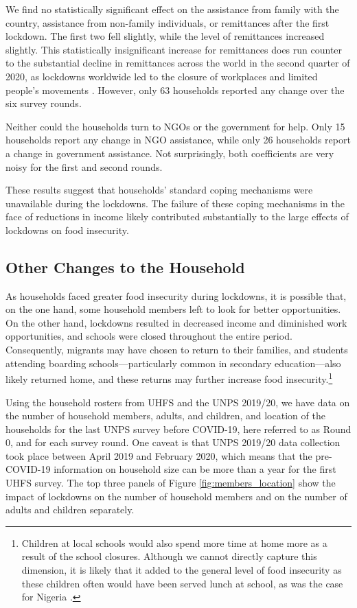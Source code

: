 \documentclass{wber}
\begin{document}
We find no statistically significant effect on the assistance from
family with the country, assistance from non-family individuals, or
remittances after the first lockdown. The first two fell slightly, while
the level of remittances increased slightly. This statistically
insignificant increase for remittances does run counter to the
substantial decline in remittances across the world in the second
quarter of 2020, as lockdowns worldwide led to the closure of workplaces
and limited people's movements
\citep{Cardozo-Silva2022, Guha2021, Kpodar2023, Shimizutani2021, Zhang2021}.
However, only 63 households reported any change over the six survey
rounds.

Neither could the households turn to NGOs or the government for help.
Only 15 households report any change in NGO assistance, while only 26
households report a change in government assistance. Not surprisingly,
both coefficients are very noisy for the first and second rounds.

These results suggest that households' standard coping mechanisms were
unavailable during the lockdowns. The failure of these coping mechanisms
in the face of reductions in income likely contributed substantially to
the large effects of lockdowns on food insecurity.

\subsection{Other Changes to the Household}\label{other-changes-to-the-household}

As households faced greater food insecurity during lockdowns, it is
possible that, on the one hand, some household members left to look for
better opportunities. On the other hand, lockdowns resulted in decreased
income and diminished work opportunities, and schools were closed
throughout the entire period. Consequently, migrants may have chosen to
return to their families, and students attending boarding
schools---particularly common in secondary education---also likely
returned home, and these returns may further increase food
insecurity.\footnote{Children at local schools would also spend more
  time at home more as a result of the school closures. Although we
  cannot directly capture this dimension, it is likely that it added to
  the general level of food insecurity as these children often would
  have been served lunch at school, as was the case for Nigeria
  \citep{Abay2021}.}

Using the household rosters from UHFS and the UNPS 2019/20, we have data
on the number of household members, adults, and children, and location
of the households for the last UNPS survey before COVID-19, here
referred to as Round 0, and for each survey round. One caveat is that
UNPS 2019/20 data collection took place between April 2019 and February
2020, which means that the pre-COVID-19 information on household size
can be more than a year for the first UHFS survey. The top three panels
of Figure \ref{fig:members_location} show the impact of lockdowns on the
number of household members and on the number of adults and children
separately.
\end{document}
